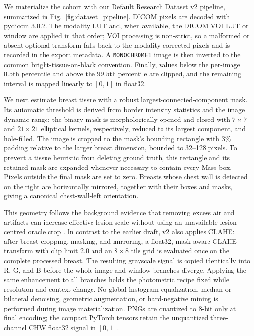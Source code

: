 We materialize the cohort with our Default Research Dataset v2 pipeline,
summarized in Fig.~\ref{fig:dataset_pipeline}.  DICOM pixels are decoded with
pydicom 3.0.2.  The modality LUT and, when available, the DICOM VOI LUT or
window are applied in that order; VOI processing is non-strict, so a malformed
or absent optional transform falls back to the modality-corrected pixels and is
recorded in the export metadata.  A \texttt{MONOCHROME1} image is then inverted
to the common bright-tissue-on-black convention.  Finally, values below the
per-image 0.5th percentile and above the 99.5th percentile are clipped, and the
remaining interval is mapped linearly to $[0,1]$ in float32.

We next estimate breast tissue with a robust largest-connected-component mask.
Its automatic threshold is derived from border intensity statistics and the
image dynamic range; the binary mask is morphologically opened and closed with
$7\!\times\!7$ and $21\!\times\!21$ elliptical kernels, respectively, reduced
to its largest component, and hole-filled.  The image is cropped to the mask's
bounding rectangle with 3\% padding relative to the larger breast dimension,
bounded to 32--128 pixels.  To prevent a tissue heuristic from deleting ground
truth, this rectangle and its retained mask are expanded whenever necessary to
contain every Mass box.  Pixels outside the final mask are set to zero.  Breasts
whose chest wall is detected on the right are horizontally mirrored, together
with their boxes and masks, giving a canonical chest-wall-left orientation.

This geometry follows the background evidence that removing excess air and
artifacts can increase effective lesion scale without using an unavailable
lesion-centred oracle crop \cite{ozic2023scenarios}.  In contrast to the earlier
draft, v2 also applies CLAHE: after breast cropping, masking, and mirroring, a
float32, mask-aware CLAHE transform with clip limit 2.0 and an
$8\!\times\!8$ tile grid is evaluated once on the complete processed breast.
The resulting grayscale signal is copied identically into R, G, and B before
the whole-image and window branches diverge.  Applying the same enhancement to
all branches holds the photometric recipe fixed while resolution and context
change.  No global histogram equalization, median or bilateral denoising,
geometric augmentation, or hard-negative mining is performed during image
materialization.  PNGs are quantized to 8-bit only at final encoding; the
compact PyTorch tensors retain the unquantized three-channel CHW float32 signal
in $[0,1]$.

